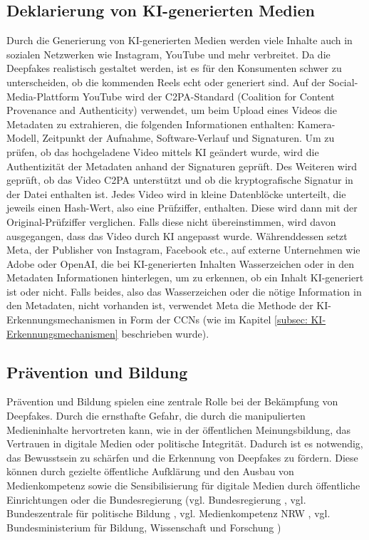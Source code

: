 \documentclass[a4paper,12pt]{article}
\begin{document}
\subsection{Deklarierung von KI-generierten Medien}
Durch die Generierung von KI-generierten Medien werden viele Inhalte auch in sozialen Netzwerken wie Instagram, 
YouTube und mehr verbreitet. 
Da die Deepfakes realistisch gestaltet werden, 
ist es für den Konsumenten schwer zu unterscheiden, 
ob die kommenden Reels echt oder generiert sind.
Auf der Social-Media-Plattform YouTube wird der C2PA-Standard (Coalition for Content Provenance and Authenticity) verwendet, 
um beim Upload eines Videos die Metadaten zu extrahieren, 
die folgenden Informationen enthalten: Kamera-Modell, 
Zeitpunkt der Aufnahme, Software-Verlauf und Signaturen. 
Um zu prüfen, ob das hochgeladene Video mittels KI geändert wurde, 
wird die Authentizität der Metadaten anhand der Signaturen geprüft. 
Des Weiteren wird geprüft, ob das Video C2PA unterstützt und ob die kryptografische Signatur in der Datei enthalten ist.
Jedes Video wird in kleine Datenblöcke unterteilt, 
die jeweils einen Hash-Wert, also eine Prüfziffer, 
enthalten. Diese wird dann mit der Original-Prüfziffer verglichen. 
Falls diese nicht übereinstimmen, wird davon ausgegangen, 
dass das Video durch KI angepasst wurde.\cite{TheVerge2024a}
Währenddessen setzt Meta, der Publisher von Instagram, Facebook etc., auf externe Unternehmen wie Adobe oder OpenAI,
die bei KI-generierten Inhalten Wasserzeichen oder in den Metadaten Informationen hinterlegen,
um zu erkennen, ob ein Inhalt KI-generiert ist oder nicht. Falls beides,
also das Wasserzeichen oder die nötige Information in den Metadaten,
nicht vorhanden ist, verwendet Meta die Methode der KI-Erkennungsmechanismen in Form der CCNs (wie im Kapitel \ref{subsec: KI-Erkennungsmechanismen} beschrieben wurde).\cite{TheVerge2024b}\cite{Meta2024}

\subsection{Prävention und Bildung}
Prävention und Bildung spielen eine zentrale Rolle bei der Bekämpfung von Deepfakes.
Durch die ernsthafte Gefahr, die durch die manipulierten Medieninhalte hervortreten kann,
wie in der öffentlichen Meinungsbildung, das Vertrauen in digitale Medien oder politische Integrität.
Dadurch ist es notwendig, das Bewusstsein zu schärfen und die Erkennung von Deepfakes zu fördern.
Diese können durch gezielte öffentliche Aufklärung und den Ausbau von Medienkompetenz sowie die Sensibilisierung für digitale Medien durch öffentliche Einrichtungen oder die Bundesregierung 
(vgl. Bundesregierung \cite{Bundesregierung2024}, vgl. Bundeszentrale für politische Bildung \cite{BPB2024}, vgl. Medienkompetenz NRW \cite{Medienkompetenz2024},
vgl. Bundesministerium für Bildung, Wissenschaft und Forschung \cite{Erwachsenenbildung2024})
\end{document}
